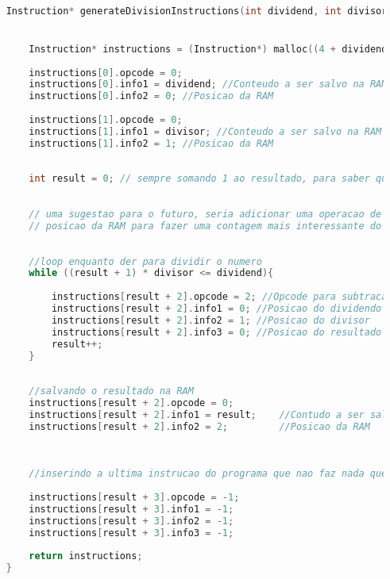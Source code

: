 \documentclass{article}
\begin{document}
\begin{lstlisting}[caption={Função generateDivisionInstructions},label={lst:cod2},language=C]

    Instruction* generateDivisionInstructions(int dividend, int divisor){


        Instruction* instructions = (Instruction*) malloc((4 + dividend/divisor) * sizeof(Instruction));
    
        instructions[0].opcode = 0;
        instructions[0].info1 = dividend; //Conteudo a ser salvo na RAM
        instructions[0].info2 = 0; //Posicao da RAM
        
        instructions[1].opcode = 0;
        instructions[1].info1 = divisor; //Conteudo a ser salvo na RAM
        instructions[1].info2 = 1; //Posicao da RAM
    
    
        int result = 0; // sempre somando 1 ao resultado, para saber quando parar, tambem serve como um indice para manter a contagem
    
    
        // uma sugestao para o futuro, seria adicionar uma operacao de soma, e um valor inicial de 0 em alguma
        // posicao da RAM para fazer uma contagem mais interessante do resultado, e nao depender da variavel
    
    
        //loop enquanto der para dividir o numero
        while ((result + 1) * divisor <= dividend){
    
            instructions[result + 2].opcode = 2; //Opcode para subtracao
            instructions[result + 2].info1 = 0; //Posicao do dividendo
            instructions[result + 2].info2 = 1; //Posicao do divisor
            instructions[result + 2].info3 = 0; //Posicao do resultado da divisao
            result++;
        }
    
    
        //salvando o resultado na RAM
        instructions[result + 2].opcode = 0;
        instructions[result + 2].info1 = result;    //Contudo a ser salvo na RAM
        instructions[result + 2].info2 = 2;         //Posicao da RAM
    
    
    
        //inserindo a ultima instrucao do programa que nao faz nada que presta
    
        instructions[result + 3].opcode = -1;
        instructions[result + 3].info1 = -1;
        instructions[result + 3].info2 = -1;
        instructions[result + 3].info3 = -1;
    
        return instructions;
    }
    \end{lstlisting}
\end{document}
